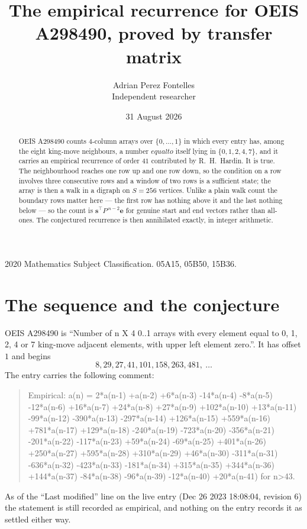 \documentclass[11pt,a4paper]{article}
\title{The empirical recurrence for OEIS A298490, proved by transfer matrix}
\author{Adrian Perez Fontelles\\ \small Independent researcher}
\date{31 August 2026}
\theoremstyle{plain}
\theoremstyle{definition}
\begin{document}
\maketitle

\begin{abstract}
OEIS A298490 counts $4$-column arrays over $\{0,\dots,1\}$ in which every entry has,
among the eight king-move neighbours, a number $equal to$ itself lying in $\{0,1,2,4,7\}$, and it carries an empirical
recurrence of order $41$ contributed by R.~H.~Hardin. It is true. The neighbourhood
reaches one row up and one row down, so the condition on a row involves three consecutive
rows and a window of two rows is a sufficient state; the array is then a walk in a digraph
on $S=256$ vertices. Unlike a plain walk count the boundary rows matter here --- the first
row has nothing above it and the last nothing below --- so the count is
$\mathbf{s}^{\!\top}P^{\,n-2}\mathbf{e}$ for genuine start and end vectors rather than
all-ones. The conjectured recurrence is then annihilated exactly, in integer arithmetic.
\end{abstract}

\noindent\small 2020 Mathematics Subject Classification. 05A15, 05B50, 15B36.\normalsize

\section{The sequence and the conjecture}

OEIS A298490 is ``Number of n X 4 0..1 arrays with every element equal to 0, 1, 2, 4 or 7 king-move adjacent elements, with upper left element zero.''. It has offset
$1$ and begins
\[
8, 29, 27, 41, 101, 158, 263, 481,\ \dots
\]
The entry carries the following comment:
\begin{quote}\small
Empirical: a(n) = 2*a(n-1) +a(n-2) +6*a(n-3) -14*a(n-4) -8*a(n-5) -12*a(n-6) +16*a(n-7) +24*a(n-8) +27*a(n-9) +102*a(n-10) +13*a(n-11) -99*a(n-12) -390*a(n-13) -297*a(n-14) +126*a(n-15) +559*a(n-16) +781*a(n-17) +129*a(n-18) -240*a(n-19) -723*a(n-20) -356*a(n-21) -201*a(n-22) -117*a(n-23) +59*a(n-24) -69*a(n-25) +401*a(n-26) +250*a(n-27) +595*a(n-28) +310*a(n-29) +46*a(n-30) -311*a(n-31) -636*a(n-32) -423*a(n-33) -181*a(n-34) +315*a(n-35) +344*a(n-36) +144*a(n-37) -84*a(n-38) -96*a(n-39) -12*a(n-40) +20*a(n-41) for n>43.
\end{quote}
As of the ``Last modified'' line on the live entry (Dec 26 2023 18:08:04, revision
6) the statement is still recorded as empirical, and nothing on the entry
records it as settled either way.
\end{document}
